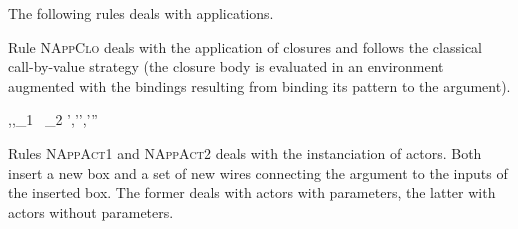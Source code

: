 




\bigskip
The following rules deals with applications.

\medskip
Rule \textsc{NAppClo} deals with the application of closures and follows the classical call-by-value
strategy (the closure body is evaluated in an environment augmented with the bindings resulting
from binding its pattern to the argument). 

{\TE,\EE,\NE \vdash {}_1 ~_2 \gives \rho',\BB\oplus\BB'\oplus\BB',\WW\cup\WW'\cup\WW''}



\medskip Rules \textsc{NAppAct1} and \textsc{NAppAct2} deals with the instanciation of actors. Both
insert a new box and a set of new wires connecting the argument to the inputs of the inserted
box. The former deals with actors with parameters, the latter with actors without parameters.

